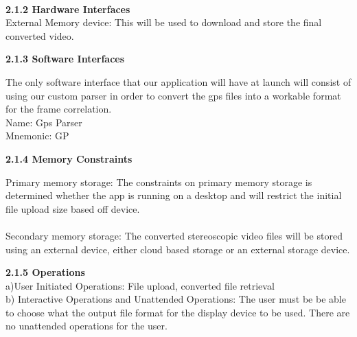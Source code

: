 \documentclass[10pt,draftclsnofoot,onecolumn]{IEEEtran}
\begin{document}
\\
\vspace{5mm}
{\Medium\textbf{2.1.2 Hardware Interfaces}} \\

\vspace{5mm}
External Memory device: This will be used to download and store the final converted video.
\vspace{5mm}


{\Medium\textbf{2.1.3 Software Interfaces}} \\

\vspace{5mm}

The only software interface that our application will have at launch will consist of using our custom parser in order to convert the gps files into a workable format for the frame correlation. \\
			Name: Gps Parser\\
			Mnemonic: GP\\



\vspace{5mm}

{\Medium\textbf{2.1.4 Memory Constraints}} \\
\vspace{5mm}

Primary memory storage: The constraints on primary memory storage is determined whether the app is running on a desktop and will restrict the initial file upload size based off device. \\\vspace{2mm}
\\
			Secondary memory storage: The converted stereoscopic video files will be stored using an external device, either cloud based storage or an external storage device.

\vspace{5mm}

{\Medium\textbf{2.1.5 Operations}} \\
\vspace{5mm}
a)User Initiated Operations: File upload, converted file retrieval\\
\vspace{2mm}
b) Interactive Operations and Unattended Operations: The user must be be able to choose what the output file format for the display device to be used. There are no unattended operations for the user.\\
\vspace{2mm}
\end{document}
